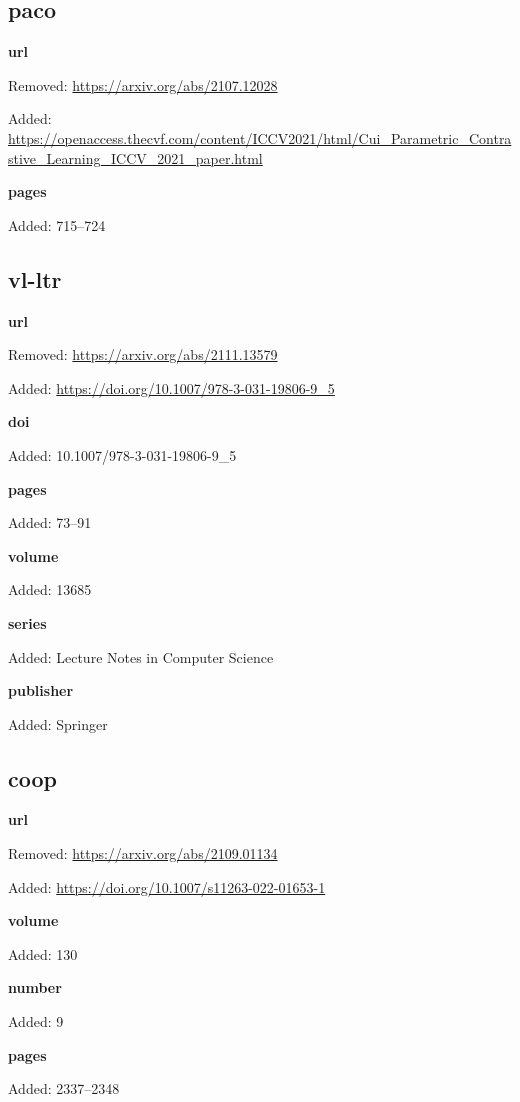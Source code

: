 \subsection*{paco}
\noindent\textbf{url}\par
{\color{AuditRed}Removed: \url{https://arxiv.org/abs/2107.12028}\par}
{\color{AuditGreen}Added: \url{https://openaccess.thecvf.com/content/ICCV2021/html/Cui_Parametric_Contrastive_Learning_ICCV_2021_paper.html}\par}
\noindent\textbf{pages}\par
{\color{AuditGreen}Added: 715–724\par}
\medskip

\subsection*{vl-ltr}
\noindent\textbf{url}\par
{\color{AuditRed}Removed: \url{https://arxiv.org/abs/2111.13579}\par}
{\color{AuditGreen}Added: \url{https://doi.org/10.1007/978-3-031-19806-9_5}\par}
\noindent\textbf{doi}\par
{\color{AuditGreen}Added: 10.1007/978-3-031-19806-9\_5\par}
\noindent\textbf{pages}\par
{\color{AuditGreen}Added: 73–91\par}
\noindent\textbf{volume}\par
{\color{AuditGreen}Added: 13685\par}
\noindent\textbf{series}\par
{\color{AuditGreen}Added: Lecture Notes in Computer Science\par}
\noindent\textbf{publisher}\par
{\color{AuditGreen}Added: Springer\par}
\medskip

\subsection*{coop}
\noindent\textbf{url}\par
{\color{AuditRed}Removed: \url{https://arxiv.org/abs/2109.01134}\par}
{\color{AuditGreen}Added: \url{https://doi.org/10.1007/s11263-022-01653-1}\par}
\noindent\textbf{volume}\par
{\color{AuditGreen}Added: 130\par}
\noindent\textbf{number}\par
{\color{AuditGreen}Added: 9\par}
\noindent\textbf{pages}\par
{\color{AuditGreen}Added: 2337–2348\par}
\medskip

